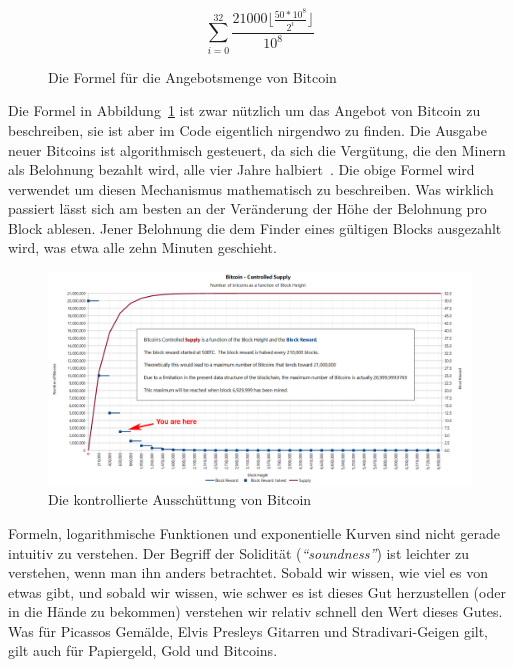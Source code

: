 \begin{figure}
  \centering
  \begin{equation}
  \sum\limits_{i=0}^{32} \frac{21000 \lfloor \frac{50*10^8}{2^i} \rfloor}{10^8}
  \end{equation}
  \caption{Die Formel für die Angebotsmenge von Bitcoin}
  \label{fig:supply-formula-white}
\end{figure}

Die Formel in Abbildung~\ref{fig:supply-formula-white} ist zwar nützlich um das
Angebot von Bitcoin zu beschreiben, sie ist aber im Code eigentlich nirgendwo zu
finden. Die Ausgabe neuer Bitcoins ist algorithmisch gesteuert, da sich die
Vergütung, die den Minern als Belohnung bezahlt wird, alle vier Jahre
halbiert~\cite{btcwiki:supply}. Die obige Formel wird verwendet um diesen
Mechanismus mathematisch zu beschreiben. Was wirklich passiert lässt sich am
besten an der Veränderung der Höhe der Belohnung pro Block ablesen. Jener
Belohnung die dem Finder eines gültigen Blocks ausgezahlt wird, was etwa alle zehn
Minuten geschieht.

\begin{figure}
  \includegraphics{assets/images/you-are-here.png}
  \caption{Die kontrollierte Ausschüttung von Bitcoin}
  \label{fig:you-are-here.png}
\end{figure}

Formeln, logarithmische Funktionen und exponentielle Kurven sind nicht gerade
intuitiv zu verstehen. Der Begriff der Solidität (\textit{\enquote{soundness}})
ist leichter zu verstehen, wenn man ihn anders betrachtet. Sobald wir wissen, wie
viel es von etwas gibt, und sobald wir wissen, wie schwer es ist dieses Gut
herzustellen (oder in die Hände zu bekommen) verstehen wir relativ schnell den
Wert dieses Gutes. Was für Picassos Gemälde, Elvis Presleys Gitarren und
Stradivari-Geigen gilt, gilt auch für Papiergeld, Gold und Bitcoins.


